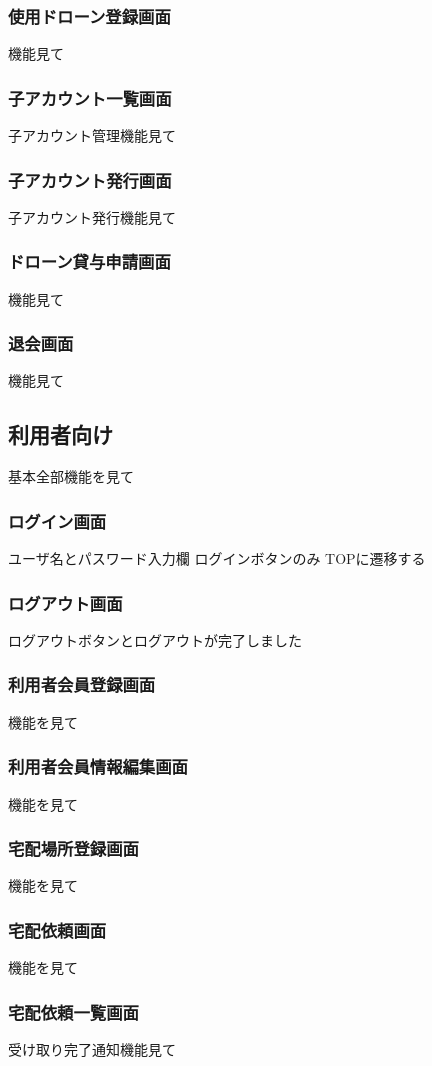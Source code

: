 \documentclass[a4paper, titlepage]{jsarticle}
\begin{document}
\subsubsection{使用ドローン登録画面}
機能見て
\subsubsection{子アカウント一覧画面}
子アカウント管理機能見て
\subsubsection{子アカウント発行画面}
子アカウント発行機能見て
\subsubsection{ドローン貸与申請画面}
機能見て
\subsubsection{退会画面}
機能見て

\subsection{利用者向け}
基本全部機能を見て
\subsubsection{ログイン画面}
ユーザ名とパスワード入力欄
ログインボタンのみ
TOPに遷移する
\subsubsection{ログアウト画面}
ログアウトボタンとログアウトが完了しました
\subsubsection{利用者会員登録画面}
機能を見て
\subsubsection{利用者会員情報編集画面}
機能を見て
\subsubsection{宅配場所登録画面}
機能を見て
\subsubsection{宅配依頼画面}
機能を見て
\subsubsection{宅配依頼一覧画面}
受け取り完了通知機能見て
\end{document}
